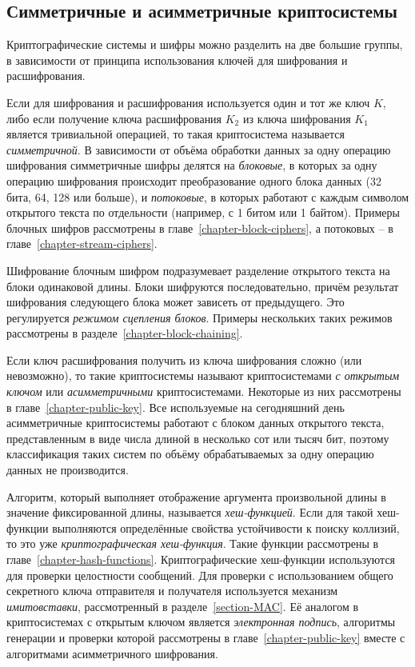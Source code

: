 \subsection{Симметричные и асимметричные криптосистемы}

Криптографические системы и шифры можно разделить на две большие группы, в зависимости от принципа использования ключей для шифрования и расшифрования.

Если для шифрования и расшифрования используется один и тот же ключ $K$, либо если получение ключа расшифрования $K_2$ из ключа шифрования $K_1$ является тривиальной операцией, то такая криптосистема называется \emph{симметричной}. В зависимости от объёма обработки данных за одну операцию шифрования симметричные шифры делятся на \emph{блоковые}, в которых за одну операцию шифрования происходит преобразование одного блока данных (32 бита, 64, 128 или больше), и \emph{потоковые}, в которых работают с каждым символом открытого текста по отдельности (например, с 1 битом или 1 байтом). Примеры блочных шифров рассмотрены в главе~\ref{chapter-block-ciphers}, а потоковых -- в главе~\ref{chapter-stream-ciphers}.

Шифрование блочным шифром подразумевает разделение открытого текста на блоки одинаковой длины. Блоки шифруются последовательно, причём результат шифрования следующего блока может зависеть от предыдущего. Это регулируется \emph{режимом сцепления блоков}. Примеры нескольких таких режимов рассмотрены в разделе~\ref{chapter-block-chaining}.

Если ключ расшифрования получить из ключа шифрования сложно (или невозможно), то такие криптосистемы называют криптосистемами \emph{с открытым ключом} или \emph{асимметричными} криптосистемами. Некоторые из них рассмотрены в главе~\ref{chapter-public-key}. Все используемые на сегодняшний день асимметричные криптосистемы работают с блоком данных открытого текста, представленным в виде числа длиной в несколько сот или тысяч бит, поэтому классификация таких систем по объёму обрабатываемых за одну операцию данных не производится.

Алгоритм, который выполняет отображение аргумента произвольной длины в значение фиксированной длины, называется \emph{хеш-функцией}. Если для такой хеш-функции выполняются определённые свойства устойчивости к поиску коллизий, то это уже \emph{криптографическая хеш-функция}. Такие функции рассмотрены в главе~\ref{chapter-hash-functions}. Криптографические хеш-функции используются для проверки целостности сообщений. Для проверки с использованием общего секретного ключа отправителя и получателя используется механизм \emph{имитовставки}, рассмотренный в разделе~\ref{section-MAC}. Её аналогом в криптосистемах с открытым ключом является \emph{электронная подпись}, алгоритмы генерации и проверки которой рассмотрены в главе~\ref{chapter-public-key} вместе с алгоритмами асимметричного шифрования.
